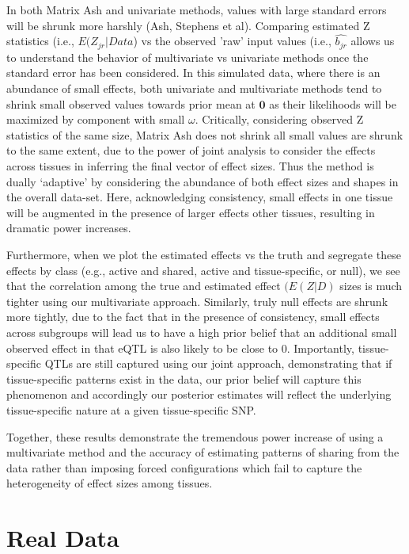 {

In both Matrix Ash and univariate methods, values with large standard errors will be shrunk more harshly (Ash, Stephens et al). Comparing estimated Z statistics (i.e., $E(Z_{jr}|Data$) vs the observed 'raw' input values (i.e., $\hat{b_{jr}}$ allows us to understand the behavior of multivariate vs univariate methods once the standard error has been considered. In this simulated data, where there is an abundance of small effects, both univariate and multivariate methods tend to shrink small observed values towards prior mean at $\bm{0}$ as their likelihoods will be maximized by component with small $\omega$. Critically, considering observed Z statistics of the same size, Matrix Ash does not shrink all small values are shrunk to the same extent, due to the power of joint analysis to consider the effects across tissues in inferring the final vector of effect sizes. Thus the method is dually `adaptive' by considering the abundance of both effect sizes and shapes in the overall data-set.  Here, acknowledging consistency, small effects in one tissue will be augmented in the presence of larger effects  other tissues, resulting in dramatic power increases. 

Furthermore, when we plot the estimated effects vs the truth and segregate these effects by class (e.g., active and shared, active and tissue-specific, or null), we see that the correlation among the true and estimated effect $(E(Z|D)$ sizes is much tighter using our multivariate approach. Similarly, truly null effects are shrunk more tightly, due to the fact that in the presence of consistency, small effects across subgroups will lead us to have a high prior belief that an additional small observed effect in that eQTL is also likely to be close to 0. Importantly, tissue-specific QTLs are still captured using our joint approach, demonstrating that if tissue-specific patterns exist in the data, our prior belief will capture this phenomenon and accordingly our posterior estimates will reflect the underlying tissue-specific nature at a given tissue-specific SNP.

Together, these results demonstrate the tremendous power increase of using a multivariate method and the accuracy of estimating patterns of sharing from the data rather than imposing forced configurations which fail to capture the heterogeneity of effect sizes among tissues.


\section{Real Data}

}
